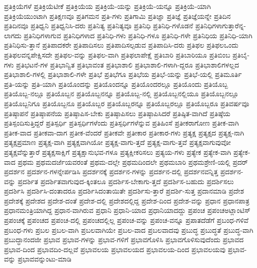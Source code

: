 {ಪ್ರತಿಕ್ರಿಯೆಗಳೆ
ಪ್ರತಿಕ್ರಿಯೆಟೀಕೆ
ಪ್ರತಿಕ್ರಿಯೆಯ
ಪ್ರತಿಕ್ರಿಯೆ-ಯನ್ನು
ಪ್ರತಿಕ್ರಿಯೆ-ಯನ್ನೂ
ಪ್ರತಿಕ್ರಿಯೆ-ಯಾಗಿ
ಪ್ರತಿಕ್ರಿಯೆಯುಂಟಾಗಿ
ಪ್ರತಿಕ್ಷಣವೂ
ಪ್ರತಿಗಮನ
ಪ್ರತಿ-ಗಳು
ಪ್ರತಿಗಾಮಿ
ಪ್ರತಿಜ್ಞಾ
ಪ್ರತಿಜ್ಞೆ
ಪ್ರತಿಜ್ಞೆಯನ್ನೇ
ಪ್ರತಿದಿನ
ಪ್ರತಿದಿನವೂ
ಪ್ರತಿಧ್ವನಿ
ಪ್ರತಿಧ್ವನಿಸಿ-ದರು
ಪ್ರತಿನಿತ್ಯ
ಪ್ರತಿನಿತ್ಯವೂ
ಪ್ರತಿನಿಧಿ
ಪ್ರತಿನಿಧಿ-ಗಳೊಡನೆ
ಪ್ರತಿನಿಧಿಗಳಾಗುತ್ತಾರೆನ್ನ-ಲಾಗದು
ಪ್ರತಿನಿಧಿಗಳಾಗುವ
ಪ್ರತಿನಿಧಿಗಳಾದ
ಪ್ರತಿನಿಧಿ-ಗಳು
ಪ್ರತಿನಿಧಿ-ಗಳೂ
ಪ್ರತಿನಿಧಿ-ಗಳೇ
ಪ್ರತಿನಿಧಿಯ
ಪ್ರತಿನಿಧಿ-ಯಾಗಿ
ಪ್ರತಿನಿಧಿಸು-ತ್ತಾನೆ
ಪ್ರತಿಪಾದಕರೇ
ಪ್ರತಿಪಾದಿಸಲು
ಪ್ರತಿಪಾದಿಸಲ್ಪಡುವ
ಪ್ರತಿಪಾದಿಸಿ-ದರು
ಪ್ರತಿಫಲ
ಪ್ರತಿಫಲಒಂದು
ಪ್ರತಿಫಲವನ್ನಪೇಕ್ಷಿಸದೇ
ಪ್ರತಿಫಲ-ವನ್ನು
ಪ್ರತಿಫಲ-ವಾಗಿ
ಪ್ರತಿಫಲಾಪೇಕ್ಷೆ
ಪ್ರತಿಬಾರಿ
ಪ್ರತಿಬಾರಿಯೂ
ಪ್ರತಿಬಿಂಬ
ಪ್ರತಿಬೈ-ಗಳು
ಪ್ರತಿಭಟನೆ-ಗಳ
ಪ್ರತಿಭಾನ್ವಿತ
ಪ್ರತಿಭಾವಂತ
ಪ್ರತಿಭಾಶಾಲಿ
ಪ್ರತಿಭಾಶಾಲಿ-ಗಳಾಗಿ-ದ್ದರೂ
ಪ್ರತಿಭಾಶಾಲಿಗಳಲ್ಲದ
ಪ್ರತಿಭಾಶಾಲಿ-ಗಳಲ್ಲಿ
ಪ್ರತಿಭಾಶಾಲಿ-ಗಳೇ
ಪ್ರತಿಭೆ
ಪ್ರತಿಭೆಗೂ
ಪ್ರತಿಭೆಯ
ಪ್ರತಿಭೆ-ಯನ್ನು
ಪ್ರತಿಭೆ-ಯಲ್ಲಿ
ಪ್ರತಿಮೂರ್ತಿ
ಪ್ರತಿ-ಯನ್ನು
ಪ್ರತಿ-ಯಾಗಿ
ಪ್ರತಿಯೊಂದನ್ನು
ಪ್ರತಿಯೊಂದನ್ನೂ
ಪ್ರತಿಯೊಂದರಲ್ಲೂ
ಪ್ರತಿಯೊಂದು
ಪ್ರತಿಯೊಬ್ಬ
ಪ್ರತಿಯೊಬ್ಬ-ನಲ್ಲೂ
ಪ್ರತಿಯೊಬ್ಬನ
ಪ್ರತಿಯೊಬ್ಬನನ್ನೂ
ಪ್ರತಿಯೊಬ್ಬ-ನಲ್ಲಿ
ಪ್ರತಿಯೊಬ್ಬನಲ್ಲಿಯೂ
ಪ್ರತಿಯೊಬ್ಬನಲ್ಲೂ
ಪ್ರತಿಯೊಬ್ಬನಿಗೂ
ಪ್ರತಿಯೊಬ್ಬನೂ
ಪ್ರತಿಯೊಬ್ಬರ
ಪ್ರತಿಯೊಬ್ಬರನ್ನೂ
ಪ್ರತಿಯೊಬ್ಬರಲ್ಲೂ
ಪ್ರತಿಯೊಬ್ಬರೂ
ಪ್ರತಿವರ್ಷವೂ
ಪ್ರತಿಷ್ಠಾಪನೆ
ಪ್ರತಿಷ್ಠಾಪನೆಯ
ಪ್ರತಿಷ್ಠಾಪಿಸ-ಬೇಕು
ಪ್ರತಿಷ್ಠಾಪಿಸಲು
ಪ್ರತಿಷ್ಠಾಪಿಸಿದರೆ
ಪ್ರತಿಷ್ಠಿತ-ವಾಗಿದೆ
ಪ್ರತಿಷ್ಠೆಯ
ಪ್ರತಿಸ್ಪಂದಿಸುತ್ತಿದ್ದರೆ
ಪ್ರತಿಸ್ಪರ್ಧಿ
ಪ್ರತಿಸ್ಪರ್ಧಿಗಳೆಂದು
ಪ್ರತಿಸ್ಪರ್ಧಿಗಳೆನ್ನುವ
ಪ್ರತಿಹಿಂಸೆ
ಪ್ರತೀಕರಾಗೋಣ
ಪ್ರತೀಕ-ವಾಗಿ
ಪ್ರತೀಕ-ವಾದ
ಪ್ರತೀಕವಾ-ದಾಗ
ಪ್ರತೀಕ-ವೆಂದರೆ
ಪ್ರತೀಕವೇ
ಪ್ರತೀಕಾರ
ಪ್ರತೀಕಾರ-ಗಳು
ಪ್ರತ್ಯಕ್ಷ
ಪ್ರತ್ಯಕ್ಷದ
ಪ್ರತ್ಯಕ್ಷ-ನಾಗಿ
ಪ್ರತ್ಯಕ್ಷಪ್ರಮಾಣ
ಪ್ರತ್ಯಕ್ಷ-ವಾಗಿ
ಪ್ರತ್ಯಕ್ಷವಾಗಿಯೋ
ಪ್ರತ್ಯಕ್ಷ-ವಾಗು-ತ್ತದೆ
ಪ್ರತ್ಯಕ್ಷ-ವಾಗು-ತ್ತವೆ
ಪ್ರತ್ಯಕ್ಷವಾಗುವುವೋ
ಪ್ರತ್ಯಕ್ಷವೆನ್ನುತ್ತಾರೆ
ಪ್ರತ್ಯಕ್ಷಸಾಕ್ಷಿಗೆ
ಪ್ರತ್ಯಕ್ಷಾನುಭವ-ಗಳೂ
ಪ್ರತ್ಯಕ್ಷೀಕರಿಸಲು
ಪ್ರತ್ಯಯ-ಗಳು
ಪ್ರತ್ಯೇಕ
ಪ್ರತ್ಯೇಕ-ವಾಗಿ
ಪ್ರತ್ಯೇಕ-ವಾದ
ಪ್ರಥಮ
ಪ್ರಥಮದರ್ಜೆಯವರಂತೆ
ಪ್ರಥಮ-ದಲ್ಲೇ
ಪ್ರಥಮದಿಂದಲೇ
ಪ್ರಥಮಬಾರಿ
ಪ್ರಥಮಶ್ರೇಣಿ-ಯಲ್ಲಿ
ಪ್ರದರ್
ಪ್ರದರ್ಶನ
ಪ್ರದರ್ಶನ-ಗಳನ್ನೇರ್ಪಡಿಸಿ
ಪ್ರದರ್ಶನಕ್ಕೆ
ಪ್ರದರ್ಶನ-ಗಳನ್ನು
ಪ್ರದರ್ಶನ-ದಲ್ಲಿ
ಪ್ರದರ್ಶನವನ್ನಿತ್ತ
ಪ್ರದರ್ಶನ-ವನ್ನು
ಪ್ರದರ್ಶಿತ
ಪ್ರದರ್ಶಿತವಾಗುವುದ-ಕ್ಕಿಂತಲೂ
ಪ್ರದರ್ಶಿಸ-ಬೇಕಾಗು-ತ್ತದೆ
ಪ್ರದರ್ಶಿಸ-ಬಹುದು
ಪ್ರದರ್ಶಿಸಲು
ಪ್ರದರ್ಶಿಸಿ
ಪ್ರದರ್ಶಿಸಿ-ದಂತಾದರೂ
ಪ್ರದರ್ಶಿಸಿದಂತಾಯಿತೇ
ಪ್ರದರ್ಶಿಸು-ತ್ತಾರೆ
ಪ್ರದರ್ಶಿ-ಸುತ್ತ
ಪ್ರದಾನಮಾಡಿ
ಪ್ರದೇಶ
ಪ್ರದೇಶಕ್ಕೆ
ಪ್ರದೇಶದ
ಪ್ರದೇಶ-ದಂತೆ
ಪ್ರದೇಶ-ದಲ್ಲಿ
ಪ್ರದೇಶದಲ್ಲಿದ್ದ
ಪ್ರದೇಶ-ದಿಂದ
ಪ್ರದೇಶ-ವನ್ನು
ಪ್ರಧಾನ
ಪ್ರಧಾನಪಾತ್ರ
ಪ್ರಧಾನಮಂತ್ರಿಯಾಗಿದ್ದ
ಪ್ರಧಾನ-ವಾಗಿರುವ
ಪ್ರಧಾನಿ
ಪ್ರಧಾನಿ-ಯಾದ
ಪ್ರಧಾನಿಯಾದದ್ದು
ಪ್ರಪಂಚ
ಪ್ರಪಂಚಅಟ್ಲಾಂಟಿಸ್
ಪ್ರಪಂಚಕ್ಕೆ
ಪ್ರಪಂಚದ
ಪ್ರಪಂಚ-ದಲ್ಲಿ
ಪ್ರಪಂಚದಲ್ಲಿಲ್ಲ
ಪ್ರಪಂಚ-ವನ್ನು
ಪ್ರಪಂಚ-ವನ್ನೂ
ಪ್ರಪಾತದೆಡೆಗೆ
ಪ್ರಬಂಧ-ಗಳಿವೆ
ಪ್ರಬಂಧ-ಗಳು
ಪ್ರಬಲ
ಪ್ರಬಲ-ವಾಗಿ
ಪ್ರಬಲವಾಗಿಯೇ
ಪ್ರಬಲ-ವಾದ
ಪ್ರಬಲವಾದವು
ಪ್ರಬುದ್ಧ
ಪ್ರಬುದ್ಧತೆ
ಪ್ರಬುದ್ಧ-ವಾಗಿ
ಪ್ರಬುದ್ಧಾನಂದಜೀ
ಪ್ರಭಾವ
ಪ್ರಭಾವ-ಗಳನ್ನು
ಪ್ರಭಾವ-ಗಳಿಗೆ
ಪ್ರಭಾವಗೊಳಿಸಿ
ಪ್ರಭಾವಗೊಳಿಸುವುದೆಂದು
ಪ್ರಭಾವದ
ಪ್ರಭಾವ-ದಿಂದ
ಪ್ರಭಾವದಿಂ-ದಲ್ಲವೆ
ಪ್ರಭಾವಲಯ
ಪ್ರಭಾವಲಯದ
ಪ್ರಭಾವಲಯ-ದಿಂದ
ಪ್ರಭಾವಲಯವು
ಪ್ರಭಾವ-ವನ್ನು
ಪ್ರಭಾವವನ್ನುಂಟು-ಮಾಡಿ
}
